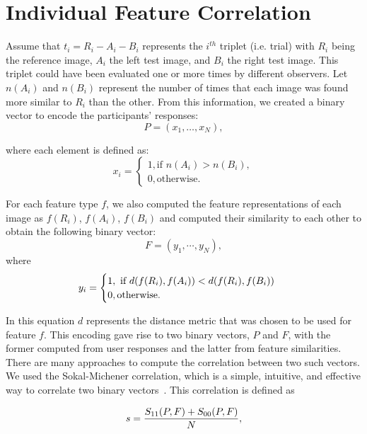 \section{Individual Feature Correlation}
Assume that $t_i = R_i-A_i-B_i$ represents the $i^{th}$ triplet (i.e. trial) with $R_i$ being the reference image, $A_i$ the left test image, and $B_i$ the right test image. This triplet could have been evaluated one or more times by different observers. Let $n(A_i)$ and $n(B_i)$ represent the number of times that each image was found more similar to $R_i$ than the other. From this information, we created a binary vector to encode the participants’ responses:
\begin{equation}
\label{eq:p_vector}
P = (x_1, \ldots, x_N),
\end{equation}

where each element is defined as:
\begin{equation}
x_i = \begin{cases}
1, \text{if $n(A_i) > n(B_i)$}, \\
0, \text{otherwise}.
\end{cases}
\end{equation}

For each feature type $f$, we also computed the feature representations of each image as $f(R_i)$, $f(A_i)$, $f(B_i)$ and computed their similarity to each other to obtain the following binary vector:
\begin{equation}
    F = (y_1,\cdots, y_N ),
\end{equation}
where
\begin{equation}
y_i = \begin{cases}
1, \text{ if $ d(f(R_i), f(A_i)) < d(f(R_i), f(B_i))$ } \\
0, \text{otherwise}.
\end{cases}
\end{equation}

In this equation $d$ represents the distance metric that was chosen to be used for feature $f$. This encoding gave rise to two binary vectors, $P$ and $F$, with the former computed from user responses and the latter from feature similarities. There are many approaches to compute the correlation between two such vectors. We used the Sokal-Michener correlation, which is a simple, intuitive, and effective way to correlate two binary vectors~\cite{zhang2003properties}. This correlation is defined as

\begin{equation}
s = {{S_{11}(P, F) + S_{00}(P, F)} \over {N}},
\end{equation}

